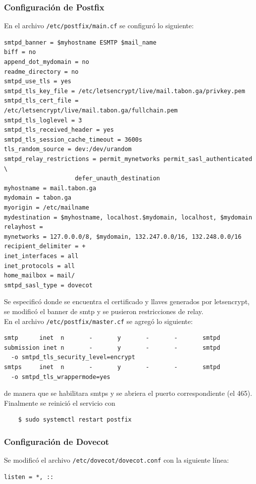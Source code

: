 \documentclass[9pt]{article}
\begin{document}
\subsubsection*{Configuración de Postfix}
En el archivo \texttt{/etc/postfix/main.cf} se configuró lo siguiente:
\begin{verbatim}
smtpd_banner = $myhostname ESMTP $mail_name         
biff = no
append_dot_mydomain = no
readme_directory = no
smtpd_use_tls = yes
smtpd_tls_key_file = /etc/letsencrypt/live/mail.tabon.ga/privkey.pem
smtpd_tls_cert_file = /etc/letsencrypt/live/mail.tabon.ga/fullchain.pem
smtpd_tls_loglevel = 3
smtpd_tls_received_header = yes
smtpd_tls_session_cache_timeout = 3600s
tls_random_source = dev:/dev/urandom
smtpd_relay_restrictions = permit_mynetworks permit_sasl_authenticated \
                    defer_unauth_destination
myhostname = mail.tabon.ga                              
mydomain = tabon.ga
myorigin = /etc/mailname
mydestination = $myhostname, localhost.$mydomain, localhost, $mydomain
relayhost = 
mynetworks = 127.0.0.0/8, $mydomain, 132.247.0.0/16, 132.248.0.0/16
recipient_delimiter = +
inet_interfaces = all
inet_protocols = all
home_mailbox = mail/
smtpd_sasl_type = dovecot
\end{verbatim}
Se especificó donde se encuentra el certificado y llaves generados por \textsf{letsencrypt}, se modificó el banner de \textsf{smtp} y se pusieron restricciones de relay. \\
En el archivo \texttt{/etc/postfix/master.cf} se agregó lo siguiente:
\begin{verbatim}
smtp      inet  n       -       y       -       -       smtpd
submission inet n       -       y       -       -       smtpd
  -o smtpd_tls_security_level=encrypt
smtps     inet  n       -       y       -       -       smtpd
  -o smtpd_tls_wrappermode=yes
\end{verbatim}
de manera que se habilitara \textsf{smtps} y se abriera el puerto correspondiente (el 465). Finalmente se reinició el servicio con
\begin{verbatim}
    $ sudo systemctl restart postfix
\end{verbatim}

\subsubsection*{Configuración de Dovecot}

Se modificó el archivo \texttt{/etc/dovecot/dovecot.conf} con la siguiente línea:
\begin{verbatim}
listen = *, ::
\end{verbatim}
\end{document}
